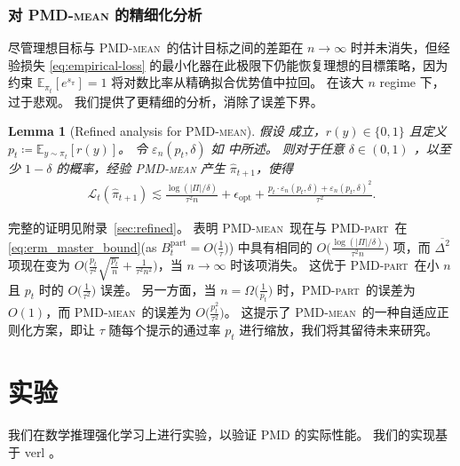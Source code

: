 \documentclass{article}
\theoremstyle{plain}
\newtheorem{lemma}[theorem]{Lemma}
\theoremstyle{definition}
\theoremstyle{remark}
\newcommand{\pmdmean}{\textsc{PMD-mean}}
\newcommand{\E}{\mathbb{E}}
\newcommand{\abs}[1]{\left|#1\right|}
\begin{document}
\subsubsection{对 \textsc{PMD-mean} 的精细化分析}
尽管理想目标与 \textsc{PMD-mean}\ 的估计目标之间的差距在 $n\to\infty$ 时并未消失，但经验损失 \eqref{eq:empirical-loss} 的最小化器在此极限下仍能恢复理想的目標策略，因为约束 $\mathbb{E}_{\pi_t}[e^{s_\pi}]=1$ 将对数比率从精确拟合优势值中拉回。  
在该大 $n$  regime 下， 过于悲观。  
我们提供了更精细的分析，消除了误差下界。 
\begin{lemma}[Refined analysis for \pmdmean]\label{lem:pmdmean_refined}
    假设  成立，$r(y)\in\{0,1\}$ 且定义 $p_t\coloneqq \E_{y\sim\pi_t}[r(y)]$。  
令 $\varepsilon_n(p_t,\delta)$ 如  中所述。  
则对于任意 $\delta\in(0,1)$ ，以至少 $1-\delta$ 的概率，经验 \textsc{PMD-mean} 产生 $\widehat{\pi}_{t+1}$，使得 
    \begin{align*}
        \mathcal{L}_t(\widehat{\pi}_{t+1})
        \lesssim
        \frac{\log(\abs{\Pi}/\delta)}{\tau^2n} +\epsilon_{\mathrm{opt}} +\frac{p_t\cdot\varepsilon_n(p_t,\delta) + \varepsilon_n(p_t,\delta)^2}{\tau^2}.
    \end{align*}
\end{lemma}
完整的证明见附录~\ref{sec:refined}。  
 表明 \textsc{PMD-mean}\ 现在与 \textsc{PMD-part}\ 在 \eqref{eq:erm_master_bound}(as $B_t^\mathrm{part}=O\bigl(\frac{1}{\tau}\bigr)$) 中具有相同的 $O\bigl(\frac{\log(\abs{\Pi}/\delta)}{\tau^2n}\bigr)$ 项，而 $\overline{\Delta^2}$ 项现在变为 $O\bigl(\frac{p_t}{\tau^2}\sqrt{\frac{p_t}{n}}+\frac{1}{\tau^2n^2}\bigr)$，当 $n\to \infty$ 时该项消失。  
这优于 \textsc{PMD-part}\ 在小 $n$ 且 $p_t$ 时的 $O\bigl(\frac{1}{\tau^2}\bigr)$ 误差。  
另一方面，当 $n=\Omega\bigl(\frac{1}{p_t}\bigr)$ 时，\textsc{PMD-part}\ 的误差为 $O(1)$，而 \textsc{PMD-mean}\ 的误差为 $O\bigl(\frac{p_t^2}{\tau^2}\bigr)$。  
这提示了 \textsc{PMD-mean}\ 的一种自适应正则化方案，即让 $\tau$ 随每个提示的通过率 $p_t$ 进行缩放，我们将其留待未来研究。 



\section{实验}
\label{sec:experiments}

我们在数学推理强化学习上进行实验，以验证 PMD 的实际性能。  
我们的实现基于 verl \citep{sheng2025hybridflow}。 
\end{document}
